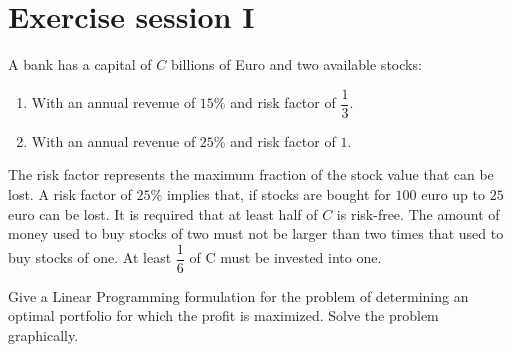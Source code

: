 \documentclass[12pt, a4paper]{report}
\newtheorem[style=M,bodystyle=\normalfont]{theorem}{Theorem}
\newtheorem[style=M,bodystyle=\normalfont]{corollary}{Corollary}
\newtheorem[style=M,bodystyle=\normalfont]{lemma}{Lemma}
\newtheorem[style=M,bodystyle=\normalfont]{definition}{Definition}
\begin{document}
\chapter{Exercise session I}
\begin{Exercise}[label=1]
    A bank has a capital of $C$ billions of Euro and two available stocks:
    \begin{enumerate}
        \item With an annual revenue of $15\%$ and risk factor of $\dfrac{1}{3}$. 
        \item With an annual revenue of $25\%$ and risk factor of $1$.
    \end{enumerate}
    The risk factor represents the maximum fraction of the stock value that can be lost. A risk factor of $25\%$ implies that, if stocks are bought for $100$ euro up to $25$ euro 
    can be lost. It is required that at least half of $C$ is risk-free. The amount of money used to buy stocks of two must not be larger than two times that used to buy stocks of one. 
    At least $\dfrac{1}{6}$ of C must be invested into one. 
    
    Give a Linear Programming formulation for the problem of determining an optimal portfolio for which the profit is maximized. 
    Solve the problem graphically.
\end{Exercise}
\end{document}
